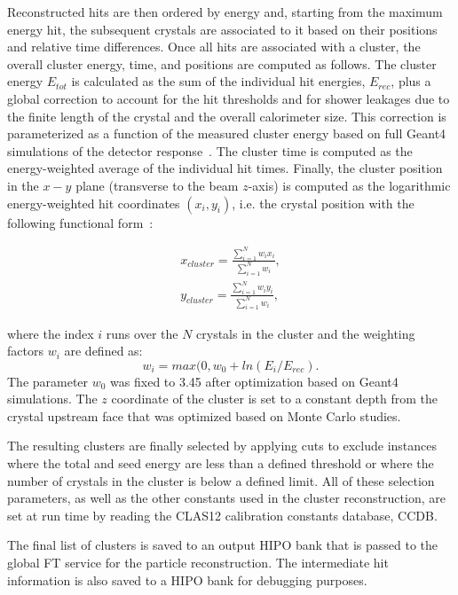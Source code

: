 Reconstructed hits are then ordered by energy and, starting from the maximum energy hit, the subsequent
crystals are associated to it based on their positions and relative time differences. Once all hits are associated
with a cluster, the overall cluster energy, time, and positions are computed as follows. The cluster energy $E_{tot}$
is calculated as the sum of the individual hit energies, $E_{rec}$, plus a global correction to account for the hit
thresholds and for shower leakages due to the finite length of the crystal and the overall calorimeter size. This
correction is parameterized as a function of the measured cluster energy based on full Geant4 simulations of the
detector response~\cite{ft-nim}. The cluster time is computed as the energy-weighted average of the individual hit
times. Finally, the cluster position in the $x-y$ plane (transverse to the beam $z$-axis) is computed as the
logarithmic energy-weighted hit coordinates $(x_i,y_i)$, i.e. the crystal position with the following functional
form~\cite{ic}:

\begin{eqnarray*}
x_{cluster} = \frac{\sum_{i=1}^N w_i x_i}{\sum_{i=1}^N w_i},\\
y_{cluster} = \frac{\sum_{i=1}^N w_i y_i}{\sum_{i=1}^N w_i},
\end{eqnarray*}

\noindent
where the index $i$ runs over the $N$ crystals in the cluster and the weighting factors $w_i$ are defined as:
\begin{equation}
w_i=max(0,w_0+ln(E_i/E_{rec}).
\end{equation}
\noindent
The parameter $w_0$ was fixed to 3.45 after optimization based on Geant4 simulations. The $z$ coordinate of
the cluster is set to a constant depth from the crystal upstream face that was optimized based on Monte Carlo
studies.

The resulting clusters are finally selected by applying cuts to exclude instances where the total and seed energy
are less than a defined threshold or where the number of crystals in the cluster is below a defined limit. All of these
selection parameters, as well as the other constants used in the cluster reconstruction, are set at run time by
reading the CLAS12 calibration constants database, CCDB.

The final list of clusters is saved to an output HIPO bank that is passed to the global FT service for the particle
reconstruction. The intermediate hit information is also saved to a HIPO bank for debugging purposes.

